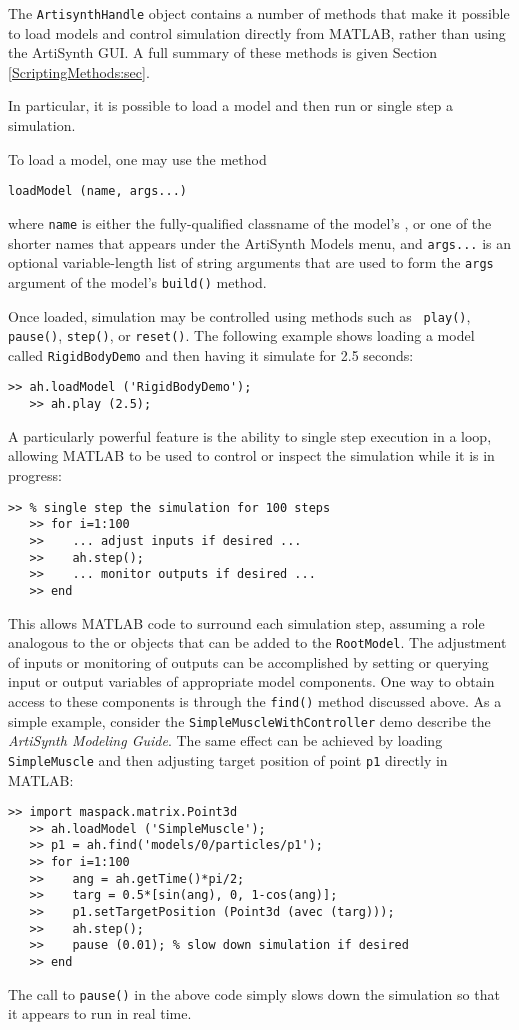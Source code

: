 \documentclass{article}
\begin{document}
The {\tt ArtisynthHandle} object contains a number of methods that
make it possible to load models and control simulation directly from
MATLAB, rather than using the ArtiSynth GUI. A full summary of these
methods is given Section \ref{ScriptingMethods:sec}.

In particular, it is possible to load a model and then run or single
step a simulation.

To load a model, one may use the method
%
\begin{lstlisting}[]
  loadModel (name, args...)
\end{lstlisting}
%
where {\tt name} is either the fully-qualified classname of the
model's 
,
or one of the shorter names that appears
under the ArtiSynth {\sf Models} menu, and {\tt args...} is an
optional variable-length list of string arguments that are used to
form the {\tt args} argument of the model's {\tt build()} method.

Once loaded, simulation may be controlled using methods such as {\tt
play()}, {\tt pause()}, {\tt step()}, or {\tt reset()}. The following
example shows loading a model called {\tt RigidBodyDemo} and
then having it simulate for 2.5 seconds:
%
\begin{lstlisting}[]
   >> ah.loadModel ('RigidBodyDemo');
   >> ah.play (2.5);
\end{lstlisting}
%
A particularly powerful feature is the ability to single step
execution in a loop, allowing MATLAB to be used to control or inspect
the simulation while it is in progress:
%
\begin{lstlisting}[]
   >> % single step the simulation for 100 steps
   >> for i=1:100
   >>    ... adjust inputs if desired ...
   >>    ah.step();
   >>    ... monitor outputs if desired ...
   >> end
\end{lstlisting}
%
This allows MATLAB code to surround each simulation step, assuming a
role analogous to the 
or  objects that can be
added to the {\tt RootModel}.  The adjustment of inputs or monitoring
of outputs can be accomplished by setting or querying input or output
variables of appropriate model components. One way to obtain access to
these components is through the {\tt find()} method discussed above.
As a simple example, consider the {\tt SimpleMuscleWithController}
demo describe the {\it ArtiSynth Modeling Guide}. The same effect
can be achieved by loading {\tt SimpleMuscle} and then adjusting
target position of point {\tt p1} directly in MATLAB:
%
\begin{lstlisting}[]
   >> import maspack.matrix.Point3d
   >> ah.loadModel ('SimpleMuscle');
   >> p1 = ah.find('models/0/particles/p1');
   >> for i=1:100
   >>    ang = ah.getTime()*pi/2;
   >>    targ = 0.5*[sin(ang), 0, 1-cos(ang)];
   >>    p1.setTargetPosition (Point3d (avec (targ)));
   >>    ah.step();
   >>    pause (0.01); % slow down simulation if desired
   >> end
\end{lstlisting}
%
The call to {\tt pause()} in the above code simply slows down the
simulation so that it appears to run in real time.
\end{document}
